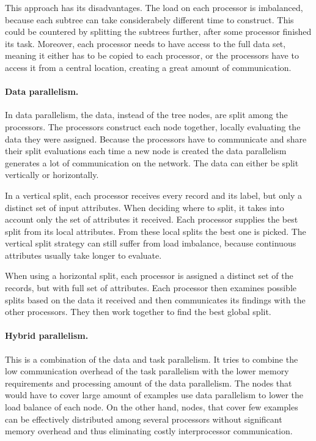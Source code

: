 \documentclass[thesis=B,english]{FITthesis}[2012/10/20]
\begin{document}
		This approach has its disadvantages. The load on each processor is imbalanced, because each subtree can take considerabely different time to construct. This could be countered by splitting the subtrees further, after some processor finished its task. Moreover, each processor needs to have access to the full data set, meaning it either has to be copied to each processor, or the processors have to access it from a central location, creating a great amount of communication. 

		\paragraph*{Data parallelism.} In data parallelism, the data, instead of the tree nodes, are split among the processors. The processors construct each node together, locally evaluating the data they were assigned. Because the processors have to communicate and share their split evaluations each time a new node is created the data parallelism generates a lot of communication on the network. The data can either be split vertically or horizontally. 

		In a vertical split, each processor receives every record and its label, but only a distinct set of input attributes. When deciding where to split, it takes into account only the set of attributes it received. Each processor supplies the best split from its local attributes. From these local splits the best one is picked. The vertical split strategy can still suffer from load imbalance, because continuous attributes usually take longer to evaluate.

		When using a horizontal split, each processor is assigned a distinct set of the records, but with full set of attributes. Each processor then examines possible splits based on the data it received and then communicates its findings with the other processors. They then work together to find the best global split.

		\paragraph*{Hybrid parallelism.} This is a combination of the data and task parallelism. It tries to combine the low communication overhead of the task parallelism with the lower memory requirements and processing amount of the data parallelism. The nodes that would have to cover large amount of examples use data parallelism to lower the load balance of each node. On the other hand, nodes, that cover few examples can be effectively distributed among several processors without significant memory overhead and thus eliminating costly interprocessor communication.
\end{document}

